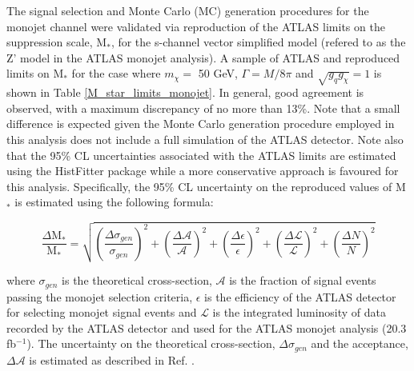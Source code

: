 \begin{flushleft}
The signal selection and Monte Carlo (MC) generation procedures for the monojet channel were validated via reproduction of the ATLAS limits on the suppression scale, M$_{*}$, for the s-channel vector simplified model (refered to as the Z' model in the ATLAS monojet analysis). A sample of ATLAS and reproduced limits on M$_{*}$ for the case where $m_{\chi} = $ 50 GeV, $\Gamma = M/8\pi$ and $\sqrt{g_{q}g_{\chi}} = 1$ is shown in Table \ref{M_star_limits_monojet}. In general, good agreement is observed, with a maximum discrepancy of no more than 13\%. Note that a small difference is expected given the Monte Carlo generation procedure employed in this analysis does not include a full simulation of the ATLAS detector.  Note also that the 95\% CL uncertainties associated with the ATLAS limits are estimated using the HistFitter package while a more conservative approach is favoured for this analysis. Specifically, the 95\% CL uncertainty on the reproduced values of M$_{*}$ is estimated using the following formula:

\begin{equation}
\label{uncertainty_formula}
\frac{\Delta \mbox{M}_{*}}{\mbox{M}_{*}} = \sqrt{\left(\frac{\Delta \sigma_{gen}}{\sigma_{gen}}\right)^{2} + \left(\frac{\Delta \mathcal{A}}{\mathcal{A}}\right)^{2} + \left(\frac{\Delta \epsilon}{\epsilon}\right)^{2} + \left(\frac{\Delta \mathcal{L}}{\mathcal{L}}\right)^{2} + \left(\frac{\Delta N}{N}\right)^{2}}
\end{equation}

where $\sigma_{gen}$ is the theoretical cross-section, $\mathcal{A}$ is the fraction of signal events passing the monojet selection criteria, $\epsilon$ is the efficiency of the ATLAS detector for selecting monojet signal events and $\mathcal{L}$ is the integrated luminosity of data recorded by the ATLAS detector and used for the ATLAS monojet analysis (20.3 fb$^{-1}$). The uncertainty on the theoretical cross-section, $\Delta \sigma_{gen}$ and the acceptance, $\Delta \mathcal{A}$ is estimated as described in Ref. \cite{CERN-THESIS-2015-038}.




\end{flushleft}

